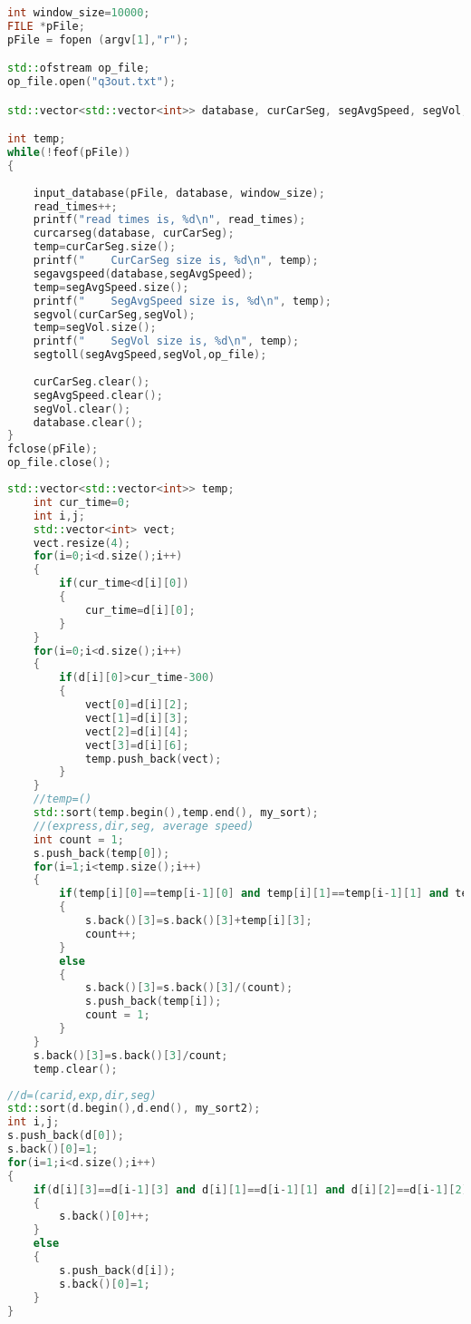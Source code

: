 \begin{lstlisting}[language=C++, caption=complex query overview, label={lst:complex_query_overview}]
int window_size=10000;
FILE *pFile;
pFile = fopen (argv[1],"r");

std::ofstream op_file;
op_file.open("q3out.txt");

std::vector<std::vector<int>> database, curCarSeg, segAvgSpeed, segVol;

int temp;
while(!feof(pFile))
{
    
    input_database(pFile, database, window_size);
    read_times++;
    printf("read times is, %d\n", read_times);
    curcarseg(database, curCarSeg);
    temp=curCarSeg.size();
    printf("    CurCarSeg size is, %d\n", temp);
    segavgspeed(database,segAvgSpeed);
    temp=segAvgSpeed.size();
    printf("    SegAvgSpeed size is, %d\n", temp);
    segvol(curCarSeg,segVol);
    temp=segVol.size();
    printf("    SegVol size is, %d\n", temp);
    segtoll(segAvgSpeed,segVol,op_file);
    
    curCarSeg.clear();
    segAvgSpeed.clear();
    segVol.clear();
    database.clear();
}
fclose(pFile);
op_file.close();
\end{lstlisting}

\begin{lstlisting}[language=C++, caption= SegAvgSpeed, label={lst:SegAvgSpeed}]
    std::vector<std::vector<int>> temp;
    int cur_time=0;
    int i,j;
    std::vector<int> vect;
    vect.resize(4);
    for(i=0;i<d.size();i++)
    {
        if(cur_time<d[i][0])
        {
            cur_time=d[i][0];
        }
    }
    for(i=0;i<d.size();i++)
    {
        if(d[i][0]>cur_time-300)
        {
            vect[0]=d[i][2];
            vect[1]=d[i][3];
            vect[2]=d[i][4];
            vect[3]=d[i][6];
            temp.push_back(vect);
        }
    }
    //temp=()
    std::sort(temp.begin(),temp.end(), my_sort);
    //(express,dir,seg, average speed)
    int count = 1;
    s.push_back(temp[0]);
    for(i=1;i<temp.size();i++)
    {
        if(temp[i][0]==temp[i-1][0] and temp[i][1]==temp[i-1][1] and temp[i][2]==temp[i-1][2])
        {
            s.back()[3]=s.back()[3]+temp[i][3];
            count++;
        }
        else
        {
            s.back()[3]=s.back()[3]/(count);
            s.push_back(temp[i]);
            count = 1;
        }
    }
    s.back()[3]=s.back()[3]/count;
    temp.clear();
\end{lstlisting}
\begin{lstlisting}[language=C++, caption=SegVol, label={lst:SegVol}]
//d=(carid,exp,dir,seg)
std::sort(d.begin(),d.end(), my_sort2);
int i,j;
s.push_back(d[0]);
s.back()[0]=1;
for(i=1;i<d.size();i++)
{
    if(d[i][3]==d[i-1][3] and d[i][1]==d[i-1][1] and d[i][2]==d[i-1][2])
    {
        s.back()[0]++;
    }
    else
    {
        s.push_back(d[i]);
        s.back()[0]=1;
    }
}
\end{lstlisting}

